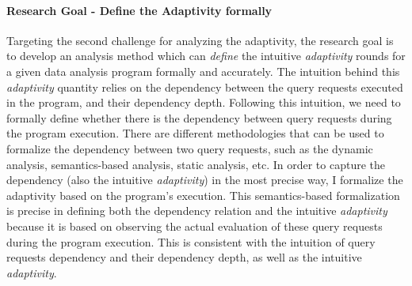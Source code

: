 \paragraph{Research Goal - Define the Adaptivity formally}
Targeting the second challenge
for analyzing the adaptivity, 
the research goal is to develop an analysis method which can
\emph{define} the intuitive \emph{adaptivity} rounds for a given data analysis program formally and accurately.
The intuition behind this \emph{adaptivity} quantity relies on the dependency between the query requests 
executed in the program, and their dependency depth. 
Following this intuition, we need to formally define whether there is the dependency between query requests during the program
execution.
%
There are different methodologies that can be used to formalize the dependency between two query requests, such as the 
dynamic analysis, semantics-based analysis, static analysis, etc.
%
In order to capture the dependency (also the intuitive \emph{adaptivity}) in the most precise way,
I formalize the adaptivity based on the program's execution.
%
This semantics-based
formalization is precise in defining both the dependency relation
and the intuitive \emph{adaptivity} because it is
based on observing the actual evaluation of these query requests during the 
program execution. This is consistent with the intuition of query requests dependency and their dependency depth,
as well as the intuitive
\emph{adaptivity}.
